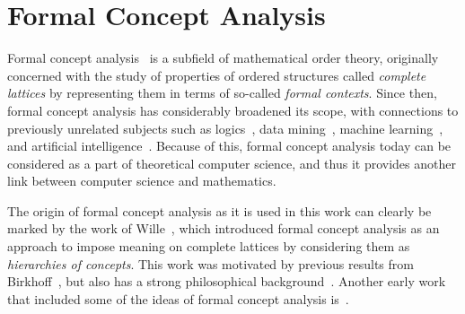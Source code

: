 \section{Formal Concept Analysis}
\label{sec:learn-impl-using}

Formal concept analysis~\cite{fca-book} is a subfield of mathematical order theory,
originally concerned with the study of properties of ordered structures called
\emph{complete lattices} by representing them in terms of so-called \emph{formal
  contexts}.  Since then, formal concept analysis has considerably broadened its scope,
with connections to previously unrelated subjects such as
logics~\cite{books/math/Prediger00,conf/iccs/FerreR00}, data
mining~\cite{arules:Zaki:1998}, machine learning~\cite{conf/icfca/Kuznetsov04}, and
artificial intelligence~\cite{phd/de/Rudolph2006,Diss-Felix}.  Because of this, formal
concept analysis today can be considered as a part of theoretical computer science, and
thus it provides another link between computer science and mathematics.

The origin of formal concept analysis as it is used in this work can clearly be marked by
the work of Wille~\cite{fca:Wille:1982}, which introduced formal concept analysis as an
approach to impose meaning on complete lattices by considering them as \emph{hierarchies
  of concepts}.  This work was motivated by previous results from
Birkhoff~\cite{books/math/Birkhoff67}, but also has a strong philosophical
background~\cite{books/phil/Hentig72,Wille:Begriffsdenken}.  Another early work that
included some of the ideas of formal concept analysis is~\cite{OrdreEtClassification}.

